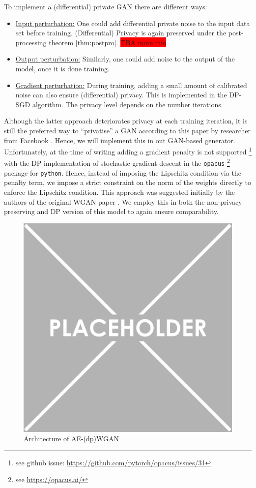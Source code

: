 To implement a (differential) private GAN there are different ways:
\begin{itemize}
    \item \underline{Input perturbation:} One could add differential private noise to the input data set before training. (Differential) Privacy is again preserved under the post-processing theorem \ref{thm:postpro}. \colorbox{red}{TBA more info}
    \item \underline{Output perturbation:} Similarly, one could add noise to the output of the model, once it is done training. 
    \item \underline{Gradient perturbation:} During training, adding a small amount of calibrated noise can also ensure (differential) privacy. This is implemented in the DP-SGD algorithm. The privacy level depends on the number iterations. 
\end{itemize}
Although the latter approach deteriorates privacy at each training iteration, it is still the preferred way to ``privatise'' a GAN according to this paper by researcher from Facebook \parencite{vandermaaten2020tradeoffs}. Hence, we will implement this in out GAN-based generator. Unfortunately, at the time of writing adding a gradient penalty is not supported \footnote{see github issue: \href{https://github.com/pytorch/opacus/issues/31}{https://github.com/pytorch/opacus/issues/31}} with the DP implementation of stochastic gradient descent in the \texttt{opacus} \footnote{see \href{https://opacus.ai/}{https://opacus.ai/}} package for \texttt{python}. Hence, instead of imposing the Lipschitz condition via the penalty term, we impose a strict constraint on the norm of the weights directly to enforce the Lipschitz condition. This approach was suggested initially by the authors of the original WGAN paper \parencite{arjovsky2017wasserstein}. We employ this in both the non-privacy preserving and DP version of this model to again ensure comparability.

\begin{figure}[h]
    \centering
    \includegraphics[scale=0.5]{../images/placeholder.png}
    \caption[short]{Architecture of AE-(dp)WGAN}
\end{figure}
